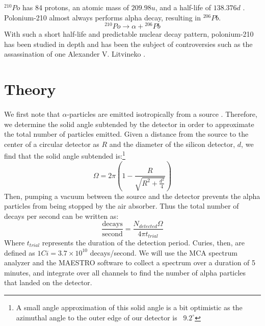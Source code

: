 \documentclass[12pt]{article}
\begin{document}
\begin{multicols}{2}
    ${}^{210}Po$ has 84 protons, an atomic mass of $209.98 u$, and a half-life of $138.376 d$ \cite{table}. Polonium-210 almost always performs alpha decay, resulting in ${}^{206}Pb$.
    \begin{equation}
        {}^{210}Po \rightarrow \alpha + {}^{206}Pb
    \end{equation}
    With such a short half-life and predictable nuclear decay pattern, polonium-210 has been studied in depth and has been the subject of controversies such as the assassination of one Alexander V. Litvineko \cite{roessler}.


    \section{Theory}
    
    \paragraph{} We first note that $\alpha$-particles are emitted isotropically from a source \cite{kovash}. Therefore, we determine the solid angle subtended by the detector in order to approximate the total number of particles emitted. Given a distance from the source to the center of a circular detector as $R$ and the diameter of the silicon detector, $d$, we find that the solid angle subtended is:\footnote{A small angle approximation of this solid angle is a bit optimistic as the azimuthal angle to the outer edge of our detector is ~$9.2^\circ$}
    \begin{equation}
        \Omega = 2\pi\left(1-\frac{R}{\sqrt{R^2 + \frac{d^2}{4}}}\right)
        \label{solidAngle}
    \end{equation}
    Then, pumping a vacuum between the source and the detector prevents the alpha particles from being stopped by the air absorber. Thus the total number of decays per second can be written as:
    \begin{equation}
        \frac{\text{decays}}{\text{second}} = \frac{N_{detected}\Omega}{4\pi t_{trial}}
    \end{equation}
    Where $t_{trial}$ represents the duration of the detection period. Curies, then, are defined as $1 Ci = 3.7 \times 10^{10}$ decays/second. We will use the MCA spectrum analyzer and the MAESTRO software to collect a spectrum over a duration of 5 minutes, and integrate over all channels to find the number of alpha particles that landed on the detector. \cite{kovash}


\end{multicols}
\end{document}
